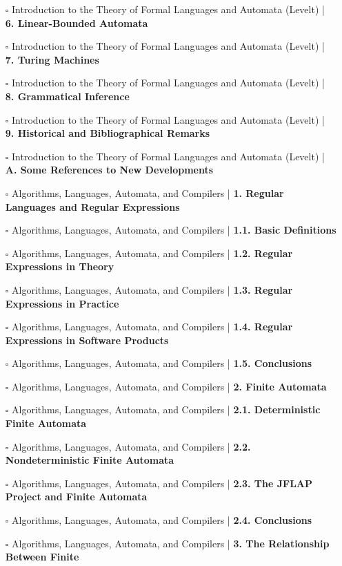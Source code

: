 \documentclass[a4, landscape, 12pt]{article}
\newcommand{\checkbox}{$\square$}%
\begin{document}
\begin{itemize}
{}
\item [\checkbox]  Introduction to the Theory of Formal Languages and Automata (Levelt) | \textbf{ 6. Linear-Bounded Automata
}
\item [\checkbox]  Introduction to the Theory of Formal Languages and Automata (Levelt) | \textbf{ 7. Turing Machines
}
\item [\checkbox]  Introduction to the Theory of Formal Languages and Automata (Levelt) | \textbf{ 8. Grammatical Inference
}
\item [\checkbox]  Introduction to the Theory of Formal Languages and Automata (Levelt) | \textbf{ 9. Historical and Bibliographical Remarks
}
\item [\checkbox]  Introduction to the Theory of Formal Languages and Automata (Levelt) | \textbf{ A. Some References to New Developments
}
\item [\checkbox]  Algorithms, Languages, Automata, and Compilers | \textbf{ 1. Regular Languages and Regular Expressions
}
\item [\checkbox]  Algorithms, Languages, Automata, and Compilers | \textbf{ 1.1. Basic Definitions
}
\item [\checkbox]  Algorithms, Languages, Automata, and Compilers | \textbf{ 1.2. Regular Expressions in Theory
}
\item [\checkbox]  Algorithms, Languages, Automata, and Compilers | \textbf{ 1.3. Regular Expressions in Practice
}
\item [\checkbox]  Algorithms, Languages, Automata, and Compilers | \textbf{ 1.4. Regular Expressions in Software Products
}
\item [\checkbox]  Algorithms, Languages, Automata, and Compilers | \textbf{ 1.5. Conclusions
}
\item [\checkbox]  Algorithms, Languages, Automata, and Compilers | \textbf{ 2. Finite Automata
}
\item [\checkbox]  Algorithms, Languages, Automata, and Compilers | \textbf{ 2.1. Deterministic Finite Automata
}
\item [\checkbox]  Algorithms, Languages, Automata, and Compilers | \textbf{ 2.2. Nondeterministic Finite Automata
}
\item [\checkbox]  Algorithms, Languages, Automata, and Compilers | \textbf{ 2.3. The JFLAP Project and Finite Automata
}
\item [\checkbox]  Algorithms, Languages, Automata, and Compilers | \textbf{ 2.4. Conclusions
}
\item [\checkbox]  Algorithms, Languages, Automata, and Compilers | \textbf{ 3. The Relationship Between Finite 
}
\end{itemize}
\end{document}
